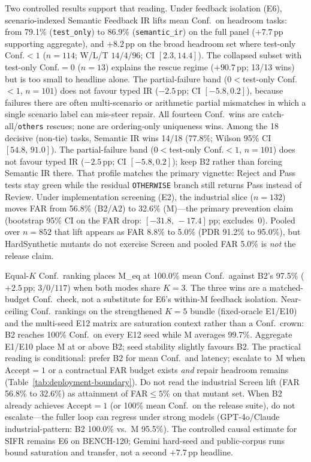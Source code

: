 Two controlled results support that reading.
Under feedback isolation (E6), scenario-indexed Semantic Feedback IR lifts
mean Conf.\ on headroom tasks: from 79.1\% (\texttt{test\_only}) to 86.9\%
(\texttt{semantic\_ir}) on the full panel (${+}7.7$\,pp supporting
aggregate), and ${+}8.2$\,pp on the broad headroom set where test-only
Conf.${<}1$ ($n{=}114$; W/L/T $14/4/96$; CI $[2.3,14.4]$).
The collapsed subset with test-only Conf.${=}0$ ($n{=}13$) explains the
rescue regime (${+}90.7$\,pp; 13/13 wins) but is too small to headline alone.
The partial-failure band ($0{<}$test-only Conf.${<}1$, $n{=}101$) does not
favour typed IR (${-}2.5$\,pp; CI $[-5.8,0.2]$), because failures there are
often multi-scenario or arithmetic partial mismatches in which a single
scenario label can mis-steer repair.
All fourteen Conf.\ wins are catch-all/\texttt{others} rescues; none are
ordering-only uniqueness wins.
Among the 18 decisive (non-tie) tasks, Semantic IR wins 14/18 (77.8\%;
Wilson 95\% CI $[54.8,\,91.0]$).
The partial-failure band ($0{<}$test-only Conf.${<}1$, $n{=}101$) does not
favour typed IR (${-}2.5$\,pp; CI $[-5.8,0.2]$); keep B2 rather than forcing
Semantic IR there.
That profile matches the primary vignette: Reject and Pass tests stay green
while the residual \texttt{OTHERWISE} branch still returns Pass instead of
Review.
Under implementation screening (E2), the industrial slice ($n{=}132$) moves
FAR from 56.8\% (B2/A2) to 32.6\% (M)---the primary prevention claim
(bootstrap 95\% CI on the FAR drop: $[-31.8,\,-17.4]$\,pp; excludes~0).
Pooled over $n{=}852$ that lift appears as FAR 8.8\% to 5.0\% (PDR 91.2\% to
95.0\%), but HardSynthetic mutants do not exercise Screen and pooled FAR 5.0\%
is \emph{not} the release claim.

Equal-$K$ Conf.\ ranking places M\_eq at 100.0\% mean Conf.\ against B2's 97.5\%
(${+}2.5$\,pp; $3/0/117$) when both modes share $K{=}3$.
The three wins are a matched-budget Conf.\ check, not a substitute for E6's
within-M feedback isolation.
Near-ceiling Conf.\ rankings on the strengthened $K{=}5$ bundle (fixed-oracle
E1/E10) and the multi-seed E12 matrix are saturation context rather than a
Conf.\ crown: B2 reaches 100\% Conf.\ on every E12 seed while M averages
99.7\%.
Aggregate E1/E10 place M at or above B2; seed stability slightly favours B2.
The practical reading is conditional: prefer B2 for mean Conf.\ and
latency; escalate to~M when $\mathrm{Accept}{=}1$ or a contractual FAR budget
exists \emph{and} repair headroom remains
(Table~\ref{tab:deployment-boundary}).
Do not read the industrial Screen lift (FAR 56.8\% to 32.6\%) as attainment of
FAR${\le}5\%$ on that mutant set.
When B2 already achieves Accept${=}1$ (or 100\% mean Conf.\ on the release
suite), do not escalate---the fuller loop can regress under strong models
(GPT-4o/Claude industrial-pattern: B2 100.0\% vs.\ M 95.5\%).
The controlled causal estimate for SIFR remains E6 on BENCH-120; Gemini
hard-seed and public-corpus runs bound saturation and transfer, not a second
${+}7.7$\,pp headline.

